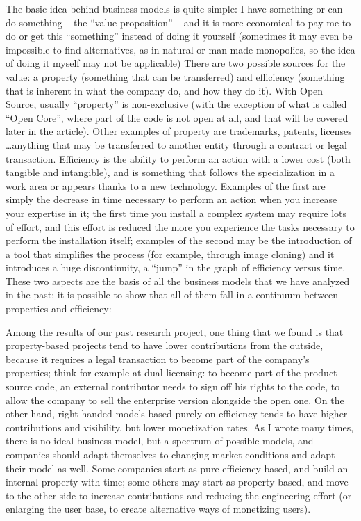 The basic idea behind business models is quite simple: I have something or can
do something – the “value proposition” -- and it is more economical to pay me to
do or get this “something” instead of doing it yourself (sometimes it may even
be impossible to find alternatives, as in natural or man-made monopolies, so the
idea of doing it myself may not be applicable)
There are two possible sources for the value: a property (something that can be
transferred) and efficiency (something that is inherent in what the company do,
and how they do it). With Open Source, usually “property” is non-exclusive (with
the exception of what is called “Open Core”, where part of the code is not open
at all, and that will be covered later in the article). Other examples of
property are trademarks, patents, licenses \dots anything that may be
transferred to another entity through a contract or legal transaction.
Efficiency is the ability to perform an action with a lower cost (both tangible
and intangible), and is something that follows the specialization in a work area
or appears thanks to a new technology. Examples of the first are simply the
decrease in time necessary to perform an action when you increase your expertise
in it; the first time you install a complex system may require lots of effort,
and this effort is reduced the more you experience the tasks necessary to
perform the installation itself; examples of the second may be the introduction
of a tool that simplifies the process (for example, through image cloning) and
it introduces a huge discontinuity, a “jump” in the graph of efficiency versus
time.
These two aspects are the basis of all the business models that we have analyzed
in the past; it is possible to show that all of them fall in a continuum between
properties and efficiency:

Among the results of our past research project, one thing that we found is that
property-based projects tend to have lower contributions from the outside,
because it requires a legal transaction to become part of the company’s
properties; think for example at dual licensing: to become part of the product
source code, an external contributor needs to sign off his rights to the code,
to allow the company to sell the enterprise version alongside the open one.
On the other hand, right-handed models based purely on efficiency tends to have
higher contributions and visibility, but lower monetization rates. As I wrote
many times, there is no ideal business model, but a spectrum of possible models,
and companies should adapt themselves to changing market conditions and adapt
their model as well. Some companies start as pure efficiency based, and build an
internal property with time; some others may start as property based, and move
to the other side to increase contributions and reducing the engineering effort
(or enlarging the user base, to create alternative ways of monetizing users).

